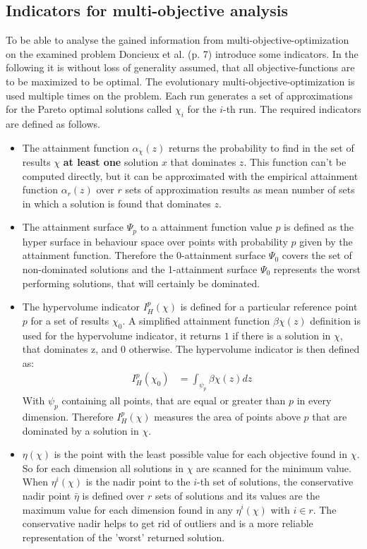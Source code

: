 \documentclass[12pt,twoside]{article}
\theoremstyle{plain}
\theoremstyle{definition}
\theoremstyle{remark}
\begin{document}
\subsection{Indicators for multi-objective analysis}
\label{back:indicators}
To be able to analyse the gained information from multi-objective-optimization on the examined problem Doncieux et al. \cite{doncieux2015multi} (p. 7) introduce some indicators.
In the following it is without loss of generality assumed, that all objective-functions are to be maximized to be optimal.
The evolutionary multi-objective-optimization is used multiple times on the problem. Each run generates a set of approximations for the Pareto optimal solutions called $\chi_i$ for the $i$-th run.
The required indicators are defined as follows.
\begin{itemize}
	\item The attainment function $\alpha_\chi(z)$ returns the probability to find in the set of results $\chi$ \textbf{at least one} solution $x$ that dominates $z$. This function can't be computed directly, but it can be approximated with the empirical attainment function $\alpha_r(z)$ over $r$ sets of approximation results as mean number of sets in which a solution is found that dominates $z$.
	\item The attainment surface $\Psi_p$ to a attainment function value $p$ is defined as the hyper surface in behaviour space over points with probability $p$ given by the attainment function.
	Therefore the 0-attainment surface $\Psi_0$ covers the set of non-dominated solutions and the 1-attainment surface $\Psi_0$ represents the worst performing solutions, that will certainly be dominated.
	\item The hypervolume indicator $I^p_H(\chi)$ is defined for a particular reference point $p$ for a set of results $\chi_0$. A simplified attainment function $\beta\chi(z)$ definition is used for the hypervolume indicator, it returns $1$ if there is a solution in $\chi$, that dominates z, and $0$ otherwise. The hypervolume indicator is then defined as:
	\begin{align*}
		I^p_H(\chi_0) &= \int_{\psi_p}\beta\chi(z) dz
	\end{align*}
	With $\psi_p$ containing all points, that are equal or greater than $p$ in every dimension.
	Therefore $I^p_H(\chi)$ measures the area of points above $p$ that are dominated by a solution in $\chi$.
	\item $\eta(\chi)$ is the point with the least possible value for each objective found in $\chi$. So for each dimension all solutions in $\chi$ are scanned for the minimum value.
	When $\eta^i(\chi)$ is the nadir point to the $i$-th set of solutions, the conservative nadir point $\bar{\eta}$ is defined over $r$ sets of solutions and its values are the maximum value for each dimension found in any $\eta^i(\chi)$ with $i\in r$. The conservative nadir helps to get rid of outliers and is a more reliable representation of the 'worst' returned solution.
\end{itemize}
\end{document}
